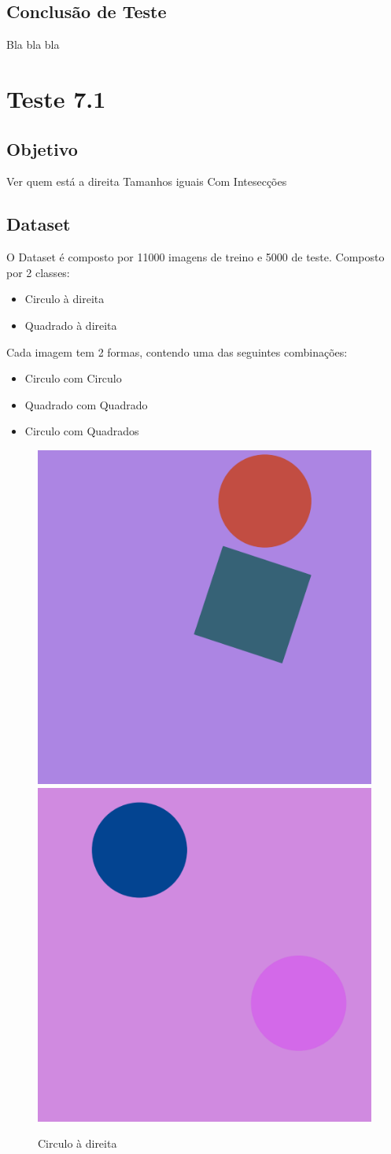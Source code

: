 \subsection{Conclusão de Teste}
    Bla bla bla

\newpage

\section{Teste 7.1}
\subsection{Objetivo}
    Ver quem está a direita
    Tamanhos iguais
    Com Intesecções
\subsection{Dataset}
O Dataset é composto por 11000 imagens de treino e 5000 de teste. Composto por 2 classes:
\begin{itemize}
        \item Circulo à direita
        \item Quadrado à direita
    \end{itemize}
    Cada imagem tem 2 formas, contendo uma das seguintes combinações:
    \begin{itemize}
        \item Circulo com Circulo
        \item Quadrado com Quadrado
        \item Circulo com Quadrados
    \end{itemize}
    \begin{figure}[H]
        \centering
            \includegraphics[width=0.25\linewidth]{imgs//Test_7/7_1/dataset/car_5629.png}
            \includegraphics[width=0.25\linewidth]{imgs//Test_7/7_1/dataset/car_7413.png}
        \caption{Circulo à direita}
        \label{fig:enter-label}
    \end{figure}
